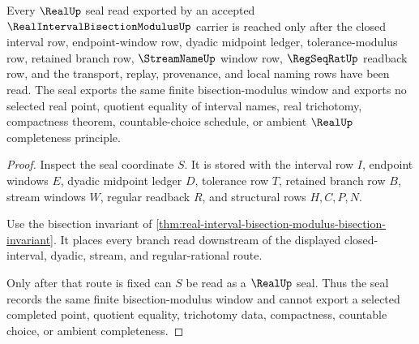 \begin{theorem}
\label{thm:real-interval-bisection-modulus-real-seal-nonescape}
Every $\RealUp$ seal read exported by an accepted $\RealIntervalBisectionModulusUp$ carrier is reached only after the closed interval row, endpoint-window row, dyadic midpoint ledger, tolerance-modulus row, retained branch row, $\StreamNameUp$ window row, $\RegSeqRatUp$ readback row, and the transport, replay, provenance, and local naming rows have been read. The seal exports the same finite bisection-modulus window and exports no selected real point, quotient equality of interval names, real trichotomy, compactness theorem, countable-choice schedule, or ambient $\RealUp$ completeness principle.
\end{theorem}
\begin{proof}
Inspect the seal coordinate $S$. It is stored with the interval row $I$, endpoint windows $E$, dyadic midpoint ledger $D$, tolerance row $T$, retained branch row $B$, stream windows $W$, regular readback $R$, and structural rows $H,C,P,N$.

Use the bisection invariant of \autoref{thm:real-interval-bisection-modulus-bisection-invariant}. It places every branch read downstream of the displayed closed-interval, dyadic, stream, and regular-rational route.

Only after that route is fixed can $S$ be read as a $\RealUp$ seal. Thus the seal records the same finite bisection-modulus window and cannot export a selected completed point, quotient equality, trichotomy data, compactness, countable choice, or ambient completeness.
\end{proof}



